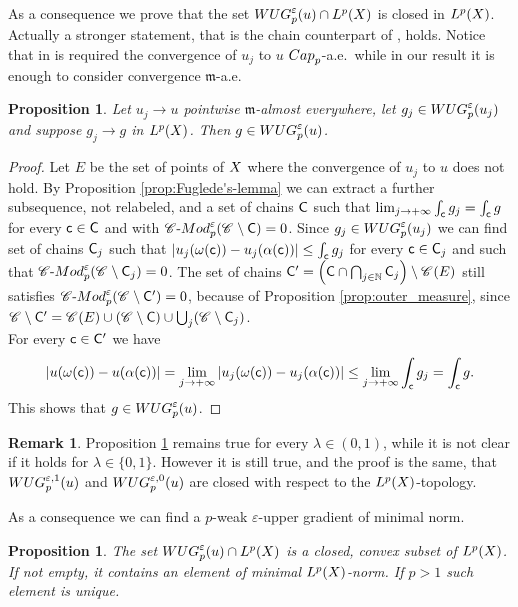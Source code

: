 \documentclass[12pt]{amsart}
\newcommand{\N}{\mathbb{N}}
\newcommand{\X}{{\rm X}}
\newcommand{\mm}{\mathfrak m}
\newtheorem{proposition}[theorem]{Proposition}
\theoremstyle{definition}
\newtheorem{remark}[theorem]{Remark}
\newcommand{\cModepsilon}[2]{{\mathscr C}\text{-}{\rm Mod}_{#2}^{#1}}
\newcommand{\sfc}{{\sf c}}
\newcommand{\sfC}{{\sf C}}
\newcommand{\Chain}[1]{\mathscr{C}^{#1}}
\newcommand{\WUG}[2]{{\rm WUG}_{#1}^{#2}}
\begin{document}
%
As a consequence we prove that the set $\WUG{p}{\varepsilon}(u) \cap L^p(\X)$ is closed in $L^p(\X)$. Actually a stronger statement, that is the chain counterpart of \cite[Proposition 6.3.30]{HKST15}, holds. Notice that in \cite[Proposition 6.3.30]{HKST15} is required the convergence of $u_j$ to $u$ ${\rm Cap}_p$-a.e.\, while in our result it is enough to consider convergence $\mm$-a.e.
\begin{proposition}
    \label{prop:limit_weak_upper_gradients}
    Let $u_j \to u$ pointwise $\mm$-almost everywhere, let $g_j \in \WUG{p}{\varepsilon}(u_j)$ and suppose $g_j \to g$ in $L^p(\X)$. Then $g \in \WUG{p}{\varepsilon}(u)$.
\end{proposition}
\begin{proof}
    Let $E$ be the set of points of $\X$ where the convergence of $u_j$ to $u$ does not hold. By Proposition \ref{prop:Fuglede's-lemma} we can extract a further subsequence, not relabeled, and a set of chains $\sfC$ such that $\lim_{j\to +\infty} \int_\sfc g_j = \int_\sfc g$ for every $\sfc \in \sfC$ and with $\cModepsilon{\varepsilon}{p}(\Chain{}\setminus \sfC) = 0$. Since $g_j \in \WUG{p}{\varepsilon}(u_j)$ we can find set of chains ${\sfC}_j$ such that $|u_j(\omega(\sfc)) - u_j(\alpha(\sfc))| \leq \int_\sfc g_j$ for every $\sfc \in {\sfC}_j$ and such that $\cModepsilon{\varepsilon}{p}(\Chain{} \setminus {\sfC}_j) = 0$. The set of chains ${\sfC}' = \left({\sfC} \cap \bigcap_{j \in \N} {\sfC}_j\right) \setminus \Chain{}(E)$ still satisfies $\cModepsilon{\varepsilon}{p}(\Chain{} \setminus {\sf C}') = 0$, because of Proposition \ref{prop:outer_measure}, since $\Chain{}\setminus {\sfC}' = \Chain{}(E) \cup (\Chain{} \setminus {\sfC}) \cup \bigcup_j (\Chain{} \setminus {\sfC}_j)$.\\
    For every $\sfc \in {\sfC}'$ we have 
    $$|u(\omega(\sfc)) - u(\alpha(\sfc))| = \lim_{j\to +\infty} |u_j(\omega(\sfc)) - u_j(\alpha(\sfc))| \le \lim_{j\to +\infty} \int_\sfc g_j = \int_\sfc g.$$
    This shows that $g\in \WUG{p}{\varepsilon}(u)$.
\end{proof}
%
\begin{remark}
    Proposition \ref{prop:limit_weak_upper_gradients} remains true for every $\lambda \in (0,1)$, while it is not clear if it holds for $\lambda \in \{0,1\}$. However it is still true, and the proof is the same, that $\WUG{p}{\varepsilon,1}(u)$ and $\WUG{p}{\varepsilon,0}(u)$ are closed with respect to the $L^p(\X)$-topology.
\end{remark}

As a consequence we can find a $p$-weak $\varepsilon$-upper gradient of minimal norm.
\begin{proposition}
\label{prop:minimal-weak-upper-gradient}
    The set $\WUG{p}{\varepsilon}(u) \cap L^p(\X)$ is a closed, convex subset of $L^p(\X)$. If not empty, it contains an element of minimal $L^p(\X)$-norm. If $p>1$ such element is unique.
\end{proposition}
\end{document}
